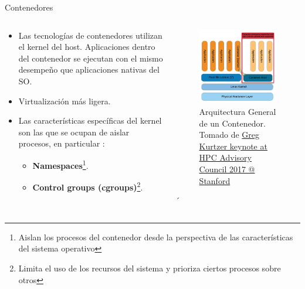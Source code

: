 \documentclass[11pt]{beamer}
\begin{document}
\begin{frame}{Contenedores}
	\begin{columns}
\begin{column}{0.5\textwidth}

	{\footnotesize
	
	\begin{itemize}
	
	\item Las tecnologías de contenedores utilizan el kernel del host. Aplicaciones dentro del contenedor se ejecutan con el mismo desempeño que aplicaciones nativas del SO.
	
	\item Virtualización más ligera. 

	
	\item Las características específicas del kernel son las que se ocupan de aislar procesos, en particular \citep{nemeth2018unix}:
	
		\begin{itemize}
			\item \textbf{\footnotesize Namespaces}\footnote{\scriptsize Aislan los procesos del contenedor desde la perspectiva de las características del sistema operativo}.
			\item \textbf{\footnotesize Control groups (cgroups)}\footnote{\scriptsize Limita el uso de los recursos del sistema y prioriza ciertos procesos sobre otros}.
		\end{itemize}
		
	\end{itemize}

}
	
\end{column}


\begin{column}{0.5\textwidth}
	\vspace{-1cm}
  \begin{figure}
  	\includegraphics[scale=1.9]{images/arquitectura_docker}
  	\caption{\footnotesize Arquitectura General de un Contenedor. Tomado de  \href{https://www.hpcadvisorycouncil.com/events/2017/stanford-workshop/pdf/GMKurtzer_Singularity_Keynote_Tuesday_02072017.pdf}{Greg Kurtzer keynote at HPC Advisory Council 2017 @ Stanford}}
  \end{figure}	´


\end{column}
\end{columns}
\end{frame}
\end{document}
